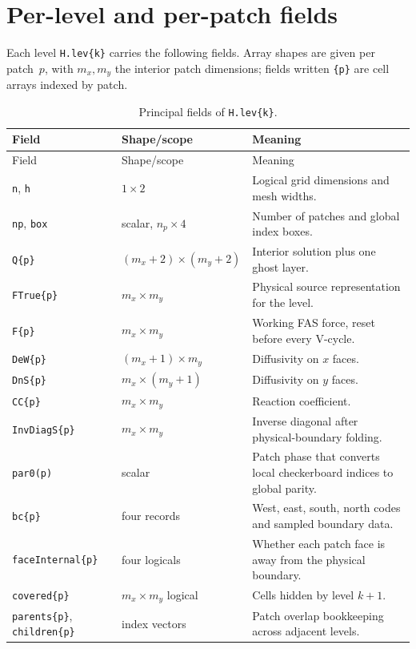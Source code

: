 \documentclass[11pt,oneside,openany]{book}
\newcommand{\code}[1]{\textnormal{\texttt{#1}}}
\begin{document}
\section{Per-level and per-patch fields}
Each level \code{H.lev\{k\}} carries the following fields. Array shapes are given per patch~$p$, with $m_x,m_y$ the interior patch dimensions; fields written \code{\{p\}} are cell arrays indexed by patch.
\begin{longtable}{@{}p{}p{}p{}@{}}
\caption{Principal fields of \code{H.lev\{k\}}.}\label{tab:levfields}\\
\toprule
Field & Shape/scope & Meaning \\
\midrule
\endfirsthead
\toprule
Field & Shape/scope & Meaning \\
\midrule
\endhead
\code{n}, \code{h} & $1\times2$ & Logical grid dimensions and mesh widths. \\
\code{np}, \code{box} & scalar, $n_p\times4$ & Number of patches and global index boxes. \\
\code{Q\{p\}} & $(m_x+2)\times(m_y+2)$ & Interior solution plus one ghost layer. \\
\code{FTrue\{p\}} & $m_x\times m_y$ & Physical source representation for the level. \\
\code{F\{p\}} & $m_x\times m_y$ & Working FAS force, reset before every V-cycle. \\
\code{DeW\{p\}} & $(m_x+1)\times m_y$ & Diffusivity on $x$ faces. \\
\code{DnS\{p\}} & $m_x\times(m_y+1)$ & Diffusivity on $y$ faces. \\
\code{CC\{p\}} & $m_x\times m_y$ & Reaction coefficient. \\
\code{InvDiagS\{p\}} & $m_x\times m_y$ & Inverse diagonal after physical-boundary folding. \\
\code{par0(p)} & scalar & Patch phase that converts local checkerboard indices to global parity. \\
\code{bc\{p\}} & four records & West, east, south, north codes and sampled boundary data. \\
\code{faceInternal\{p\}} & four logicals & Whether each patch face is away from the physical boundary. \\
\code{covered\{p\}} & $m_x\times m_y$ logical & Cells hidden by level $k+1$. \\
\code{parents\{p\}}, \code{children\{p\}} & index vectors & Patch overlap bookkeeping across adjacent levels. \\

\end{longtable}
\end{document}
